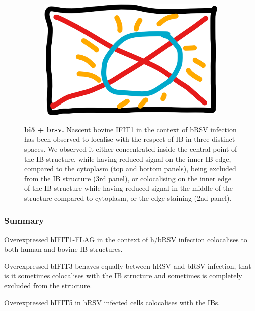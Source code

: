 \begin{figure}
\begin{subfigure}{0.5\textwidth}
    \end{subfigure}
    \begin{subfigure}{1\textwidth}
        \centering
        \caption{}
        \includegraphics[width=1\linewidth]{09. Chapter 4/Figs/00. placeholder.png}
    \end{subfigure}
    \caption[bi5 + brsv]{\textbf{bi5 + brsv.} Nascent bovine IFIT1 in the context of bRSV infection has been observed to localise with the respect of IB in three distinct spaces. We observed it either concentrated inside the central point of the IB structure, while having reduced signal on the inner IB edge, compared to the cytoplasm (top and bottom panels), being excluded from the IB structure (3rd panel), or colocalising on the inner edge of the IB structure while having reduced signal in the middle of the structure compared to cytoplasm, or the edge staining (2nd panel).}
    \label{fig:bi5 + brsv}
\end{figure}

\subsubsection{Summary} \label{Summary-oe}
Overexpressed hIFIT1-FLAG in the context of h/bRSV infection colocalises to both human and bovine IB structures.

Overexpressed bIFIT3 behaves equally between hRSV and bRSV infection, that is it sometimes colocalises with the IB structure and sometimes is completely excluded from the structure.

Overexpressed hIFIT5 in hRSV infected cells colocalises with the IBs.